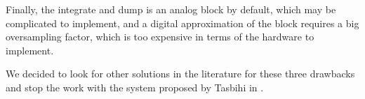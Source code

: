Finally, the integrate and dump is an analog block by default, which may be complicated to implement, and a digital approximation of the block requires a big oversampling factor, which is too expensive in terms of the hardware to implement.

We decided to look for other solutions in the literature for these three drawbacks and stop the work with the system proposed by Tasbihi in \cite{Tasbihi_Tukey}.


































